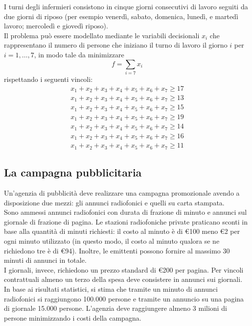 \documentclass[a4paper]{extarticle}
\begin{document}
\vspace{1em}
\noindent
I turni degli infermieri consistono in cinque giorni consecutivi di lavoro seguiti da due giorni di riposo (per esempio venerdì, sabato, domenica, lunedì, e martedì lavoro; mercoledì e giovedì riposo).\\
Il problema può essere modellato mediante le variabili decisionali $x_i$ che rappresentano il numero di persone che iniziano il turno di
lavoro il giorno $i$ per $i = 1,\dots,7$, in modo tale da minimizzare
\[f = \sum_{i=7} x_i\]
rispettando i seguenti vincoli:
\begin{align}
    x_1+x_2+x_3+x_4+x_5+x_6+x_7 \geq 17\\
    x_1+x_2+x_3+x_4+x_5+x_6+x_7 \geq 13\\
    x_1+x_2+x_3+x_4+x_5+x_6+x_7 \geq 15\\
    x_1+x_2+x_3+x_4+x_5+x_6+x_7 \geq 19\\
    x_1+x_2+x_3+x_4+x_5+x_6+x_7 \geq 14\\
    x_1+x_2+x_3+x_4+x_5+x_6+x_7 \geq 16\\
    x_1+x_2+x_3+x_4+x_5+x_6+x_7 \geq 11
\end{align}

\vspace{1em}
\noindent
\subsection{La campagna pubblicitaria}
Un'agenzia di pubblicità deve realizzare una campagna promozionale avendo a disposizione due mezzi: gli annunci radiofonici e quelli su carta stampata.\\
Sono ammessi annunci radiofonici con durata di frazione di minuto e annunci sul giornale di frazione di pagina. Le stazioni radiofoniche private praticano sconti in base alla quantità di minuti richiesti: il costo al minuto è di €100 meno €2 per ogni minuto utilizzato (in questo modo, il costo al minuto qualora se ne richiedono tre è di €94). Inoltre, le emittenti possono fornire al massimo 30 minuti di annunci in totale.\\
I giornali, invece, richiedono un prezzo standard di €200 per pagina. Per vincoli contrattuali almeno un terzo della spesa deve consistere in annunci sui giornali. In base ai risultati statistici, si stima che tramite un minuto di annunci radiofonici si raggiungono 100.000 persone e tramite un annuncio su una pagina di giornale 15.000 persone. L'agenzia deve raggiungere almeno 3 milioni di persone minimizzando i costi della campagna.
\end{document}
